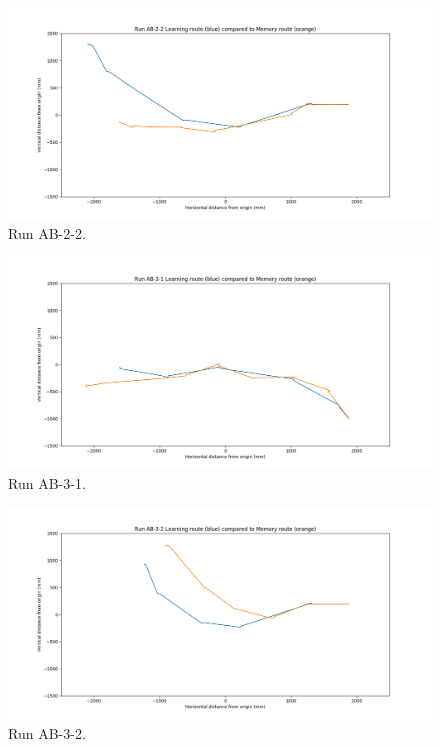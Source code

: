 \documentclass[a4paper,11pt,twoside,openright]{article}
\begin{document}
\begin{figure}[h!]
 \centering
  \includegraphics[width=\textwidth]{AB-2-2}
  \caption{
    \label{fig:ab-2-2} Run AB-2-2.
  }
\end{figure}

\begin{figure}[h!]
 \centering
  \includegraphics[width=\textwidth]{AB-3-1}
  \caption{
    \label{fig:ab-3-1} Run AB-3-1.
  }
\end{figure}

\begin{figure}[h!]
 \centering
  \includegraphics[width=\textwidth]{AB-3-2}
  \caption{
    \label{fig:ab-3-2} Run AB-3-2.
  }
\end{figure}
\end{document}
